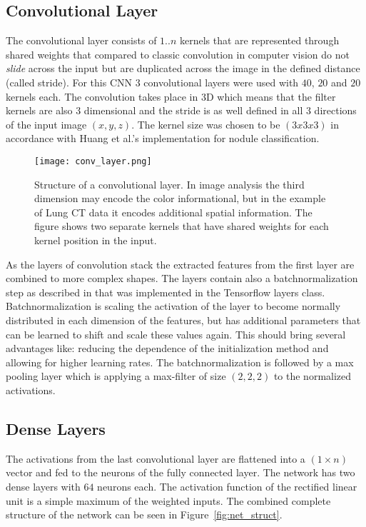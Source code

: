 \documentclass[main.tex]{subfiles}
\begin{document}
\subsection{Convolutional Layer}\label{ss:convlayer}
The convolutional layer consists of $1..n$ kernels that are represented through shared weights that compared to classic convolution in computer vision do not \emph{slide} across the input but are duplicated across the image in the defined distance (called stride). For this CNN $3$ convolutional layers were used with $40$, $20$ and $20$ kernels each. The convolution takes place in 3D which means that the filter kernels are also 3 dimensional and the stride is as well defined in all 3 directions of the input image $(x,y,z)$. The kernel size was chosen to be $(3x3x3)$ in accordance with Huang et al.'s\cite{huang2017lung} implementation for nodule classification. 

\begin{figure}
\begin{center}
\texttt{[image: conv\_layer.png]}
\end{center}
\caption{Structure of a convolutional layer. In image analysis the third dimension may encode the color informational, but in the example of Lung CT data it encodes additional spatial information. The figure shows two separate kernels that have shared weights for each kernel position in the input.}
\label{fig:conv_layer}
\end{figure}

As the layers of convolution stack the extracted features from the first layer are combined to more complex shapes. The layers contain also a batchnormalization step as described in \cite{ioffe2015batch} that was implemented in the Tensorflow layers class. Batchnormalization is scaling the activation of the layer to become normally distributed in each dimension of the features, but has additional parameters that can be learned to shift and scale these values again. This should bring several advantages like: reducing the dependence of the initialization method and allowing for higher learning rates. The batchnormalization is followed by a max pooling layer which is applying a max-filter of size $(2,2,2)$ to the normalized activations.


\subsection{Dense Layers}
The activations from the last convolutional layer are flattened into a $(1 \times n)$ vector and fed to the neurons of the fully connected layer. The network has two dense layers with $64$ neurons each. The activation function of the rectified linear unit is a simple maximum of the weighted inputs. The combined complete structure of the network can be seen in Figure~\ref{fig:net_struct}.
\end{document}
